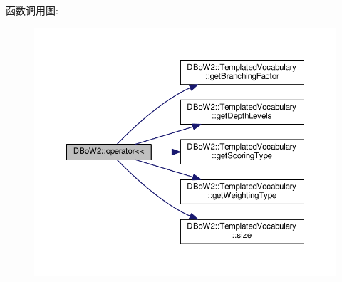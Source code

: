 函数调用图\-:
\nopagebreak
\begin{figure}[H]
\begin{center}
\leavevmode
\includegraphics[width=350pt]{namespaceDBoW2_aecdf616fe16d2cf09f521a603b9d43f1_cgraph}
\end{center}
\end{figure}


